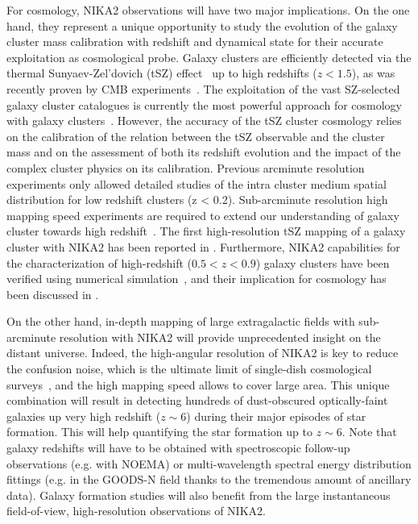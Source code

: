 \documentclass[traditionalabstract]{aa}
\newcommand{\lp}[1]{#1}
\newcommand{\rev}[1]{#1}
\begin{document}
For cosmology, NIKA2 observations will have two major
implications. On the one hand, they represent a unique opportunity to
study the evolution of the galaxy cluster mass calibration with
redshift and {\lp dynamical state} for their accurate exploitation as cosmological probe. 
Galaxy clusters are efficiently detected via the thermal
Sunyaev-Zel'dovich (tSZ) effect~\citep{SZ1970} up to high redshifts {\lp ($z<1.5$)}, as was recently
proven by CMB
experiments~\citep{Hasselfield2013_ACT_SZ, Reichardt2013_SPT_SZ, Planck2016_SZcat}.
The exploitation of the vast SZ-selected galaxy cluster catalogues is
currently the most powerful approach for cosmology with galaxy
clusters~\citep{Planck_2016_SZ_cosmo}. However, the accuracy of the tSZ cluster
cosmology relies on the calibration of the relation between the tSZ
observable and the cluster mass and on the assessment of both its redshift
evolution and the impact of the complex cluster physics on its calibration. 
Previous arcminute resolution experiments only allowed detailed studies
of the intra cluster medium spatial distribution for low redshift clusters (z <
0.2). Sub-arcminute resolution high mapping speed experiments are
required to extend our understanding of galaxy cluster towards high
redshift~\citep{Tony2019}. The first high-resolution
tSZ mapping of a galaxy cluster with NIKA2 has been reported
in \citet{Ruppin2018}. Furthermore, NIKA2 capabilities for the
characterization of high-redshift {\lp ($0.5<z<0.9$)} galaxy clusters
have been verified using numerical simulation~\citep{Ruppin2019}, and
their implication for cosmology has been discussed
in \citet{Ruppin2019b}.


On the other hand, in-depth mapping of large extragalactic fields with
sub-arcminute resolution with NIKA2 will provide unprecedented insight
on the distant universe. 
{\lp Indeed, the high-angular resolution of NIKA2 is key to reduce the
confusion noise, which is the ultimate limit of single-dish cosmological
surveys~\citep{Bethermin2017_simu}, and the high mapping speed allows
to cover large area.}
{\rev This unique combination will result in detecting hundreds of
dust-obscured optically-faint galaxies up very high redshift
($z \sim 6$) during their major episodes of star formation.}
This will help quantifying the star formation up to $z \sim 6$.
{\rev Note that galaxy redshifts will have to be obtained with
spectroscopic follow-up observations (e.g. with NOEMA) or
multi-wavelength spectral energy distribution fittings
(e.g. in the GOODS-N field thanks to the tremendous amount of
ancillary data). Galaxy formation studies will also
benefit from the large instantaneous field-of-view, high-resolution
observations of NIKA2.}
\end{document}
